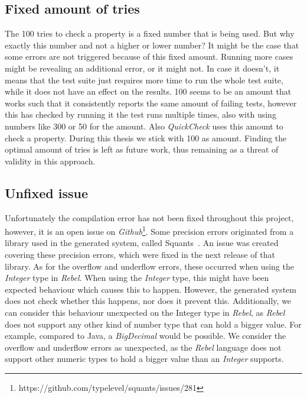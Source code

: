\subsection*{Fixed amount of tries}
The 100 tries to check a property is a fixed number that is being used. But why exactly this number and not a higher or lower number? It might be the case that some errors are not triggered because of this fixed amount. Running more cases might be revealing an additional error, or it might not. In case it doesn't, it means that the test suite just requires more time to run the whole test suite, while it does not have an effect on the results. 100 seems to be an amount that works such that it consistently reports the same amount of failing tests, however this has checked by running it the test runs multiple times, also with using numbers like 300 or 50 for the amount. Also \textit{QuickCheck} uses this amount to check a property. During this thesis we stick with 100 as amount. Finding the optimal amount of tries is left as future work, thus remaining as a threat of validity in this approach.

\subsection*{Unfixed issue}
Unfortunately the compilation error has not been fixed throughout this project, however, it is an open issue on \textit{Github}\footnote{https://github.com/typelevel/squants/issues/281}. Some precision errors originated from a library used in the generated system, called Squants~\cite{siteSquants2017}. An issue was created covering these precision errors, which were fixed in the next release of that library. As for the overflow and underflow errors, these occurred when using the \textit{Integer} type in \textit{Rebel}. When using the \textit{Integer} type, this might have been expected behaviour which causes this to happen. However, the generated system does not check whether this happens, nor does it prevent this. Additionally, we can consider this behaviour unexpected on the Integer type in
\textit{Rebel}, as \textit{Rebel} does not support any other kind of number type that can hold a bigger value. For example, compared to
Java, a \textit{BigDecimal} would be possible. We consider the overflow and underflow errors as unexpected, as the \textit{Rebel} language does not support other numeric types to hold a bigger value than an \textit{Integer} supports.
